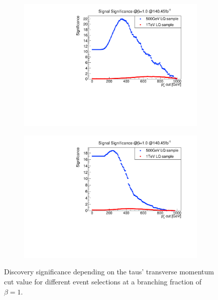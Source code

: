 \begin{figure}
\begin{subfigure}[t]{0.49\textwidth}
                \end{subfigure}
                \begin{subfigure}[t]{0.49\textwidth}
                \includegraphics[width=\textwidth]{figures/plots/Significance/xcut_pt_1b-jet_1tau.pdf}
                \label{xcut:pt:1b1tau}
                \end{subfigure}
                \begin{subfigure}[t]{0.49\textwidth}
                \includegraphics[width=\textwidth]{figures/plots/Significance/xcut_pt_1b-jet_2tau.pdf}
                \label{xcut:pt:1b2tau}
                \end{subfigure}
\caption[Discovery significance depending on the taus' transverse momentum cut value.]{Discovery significance depending on the taus' transverse momentum cut value for different event selections at a branching fraction of $\beta=1$. }
\label{xcut:pt}
\end{figure}
